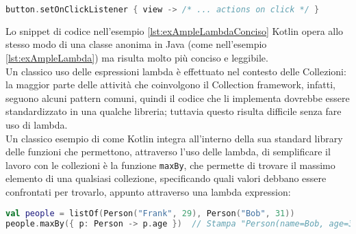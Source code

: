 \begin{lstlisting}[caption={Definizione di una lambda in Kotlin}, captionpos=b, label={lst:exAmpleLambdaConciso}, language=Kotlin]
button.setOnClickListener { view -> /* ... actions on click */ }
\end{lstlisting}

Lo snippet di codice nell'esempio \ref{lst:exAmpleLambdaConciso} Kotlin opera allo stesso modo di una classe anonima in Java (come nell'esempio \ref{lst:exAmpleLambda}) ma risulta molto più conciso e leggibile.\\
Un classico uso delle espressioni lambda è effettuato nel contesto delle Collezioni: la maggior parte delle attività che coinvolgono il Collection framework, infatti, seguono alcuni pattern comuni, quindi il codice che li implementa dovrebbe essere standardizzato in una qualche libreria; tuttavia questo risulta difficile senza fare uso di lambda.\\
Un classico esempio di come Kotlin integra all'interno della sua standard library delle funzioni che permettono, attraverso l'uso delle lambda, di semplificare il lavoro con le collezioni è la funzione \texttt{maxBy}, che permette di trovare il massimo elemento di una qualsiasi collezione, specificando quali valori debbano essere confrontati per trovarlo, appunto attraverso una lambda expression:\\

\begin{lstlisting}[caption={La funzione \texttt{maxBy}}, captionpos=b, label={lst:exAmpleLambdamaxBy}, language=Kotlin]
val people = listOf(Person("Frank", 29), Person("Bob", 31))
people.maxBy({ p: Person -> p.age })  // Stampa "Person(name=Bob, age=31)"
\end{lstlisting}


